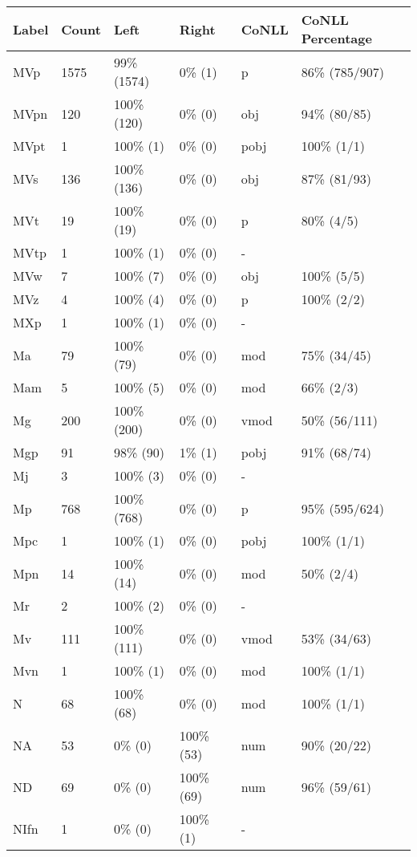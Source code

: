 \begin{figure*}
\begin{tabular}{|l|l|l|l||l|l|}
\hline
Label & Count & Left & Right & CoNLL & CoNLL Percentage\\ 
\hline
 MVp & 1575 & 99\% (1574) & 0\% (1) & p & 86\% (785/907) \\ 
\hline
 MVpn & 120 & 100\% (120) & 0\% (0) & obj & 94\% (80/85) \\ 
\hline
 MVpt & 1 & 100\% (1) & 0\% (0) & pobj & 100\% (1/1) \\ 
\hline
 MVs & 136 & 100\% (136) & 0\% (0) & obj & 87\% (81/93) \\ 
\hline
 MVt & 19 & 100\% (19) & 0\% (0) & p & 80\% (4/5) \\ 
\hline
 MVtp & 1 & 100\% (1) & 0\% (0) & - &  \\ 
\hline
 MVw & 7 & 100\% (7) & 0\% (0) & obj & 100\% (5/5) \\ 
\hline
 MVz & 4 & 100\% (4) & 0\% (0) & p & 100\% (2/2) \\ 
\hline
 MXp & 1 & 100\% (1) & 0\% (0) & - &  \\ 
\hline
 Ma & 79 & 100\% (79) & 0\% (0) & mod & 75\% (34/45) \\ 
\hline
 Mam & 5 & 100\% (5) & 0\% (0) & mod & 66\% (2/3) \\ 
\hline
 Mg & 200 & 100\% (200) & 0\% (0) & vmod & 50\% (56/111) \\ 
\hline
 Mgp & 91 & 98\% (90) & 1\% (1) & pobj & 91\% (68/74) \\ 
\hline
 Mj & 3 & 100\% (3) & 0\% (0) & - &  \\ 
\hline
 Mp & 768 & 100\% (768) & 0\% (0) & p & 95\% (595/624) \\ 
\hline
 Mpc & 1 & 100\% (1) & 0\% (0) & pobj & 100\% (1/1) \\ 
\hline
 Mpn & 14 & 100\% (14) & 0\% (0) & mod & 50\% (2/4) \\ 
\hline
 Mr & 2 & 100\% (2) & 0\% (0) & - &  \\ 
\hline
 Mv & 111 & 100\% (111) & 0\% (0) & vmod & 53\% (34/63) \\ 
\hline
 Mvn & 1 & 100\% (1) & 0\% (0) & mod & 100\% (1/1) \\ 
\hline
 N & 68 & 100\% (68) & 0\% (0) & mod & 100\% (1/1) \\ 
\hline
 NA & 53 & 0\% (0) & 100\% (53) & num & 90\% (20/22) \\ 
\hline
 ND & 69 & 0\% (0) & 100\% (69) & num & 96\% (59/61) \\ 
\hline
 NIfn & 1 & 0\% (0) & 100\% (1) & - &  \\ 

\end{tabular}
\end{figure*}
